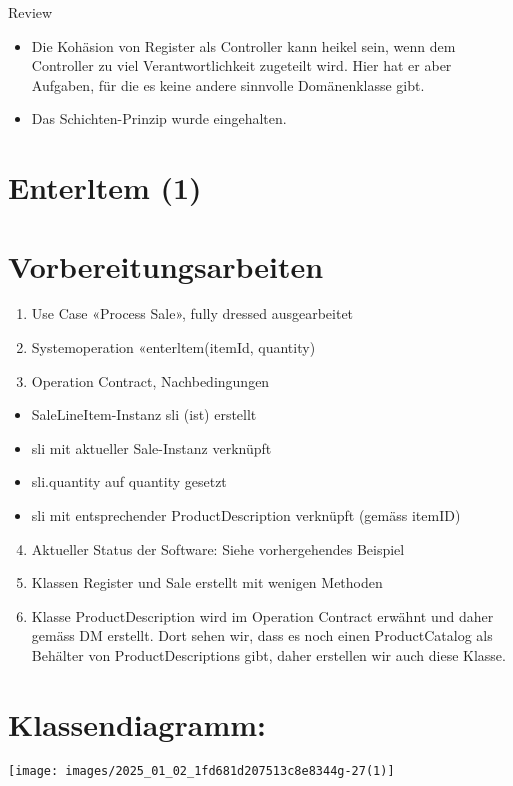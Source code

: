 \documentclass[10pt]{article}
\begin{document}
Review

\begin{itemize}
  \item Die Kohäsion von Register als Controller kann heikel sein, wenn dem Controller zu viel Verantwortlichkeit zugeteilt wird. Hier hat er aber Aufgaben, für die es keine andere sinnvolle Domänenklasse gibt.
  \item Das Schichten-Prinzip wurde eingehalten.
\end{itemize}

\section*{Enterltem (1)}
\section*{Vorbereitungsarbeiten}
\begin{enumerate}
  \item Use Case «Process Sale», fully dressed ausgearbeitet
  \item Systemoperation «enterltem(itemId, quantity)
  \item Operation Contract, Nachbedingungen
\end{enumerate}

\begin{itemize}
  \item SaleLineItem-Instanz sli (ist) erstellt
  \item sli mit aktueller Sale-Instanz verknüpft
  \item sli.quantity auf quantity gesetzt
  \item sli mit entsprechender ProductDescription verknüpft (gemäss itemID)
\end{itemize}

\begin{enumerate}
  \setcounter{enumi}{3}
  \item Aktueller Status der Software: Siehe vorhergehendes Beispiel
  \item Klassen Register und Sale erstellt mit wenigen Methoden
  \item Klasse ProductDescription wird im Operation Contract erwähnt und daher gemäss DM erstellt. Dort sehen wir, dass es noch einen ProductCatalog als Behälter von ProductDescriptions gibt, daher erstellen wir auch diese Klasse.
\end{enumerate}

\section*{Klassendiagramm:}
\begin{center}
\texttt{[image: images/2025\_01\_02\_1fd681d207513c8e8344g-27(1)]}
\end{center}
\end{document}
